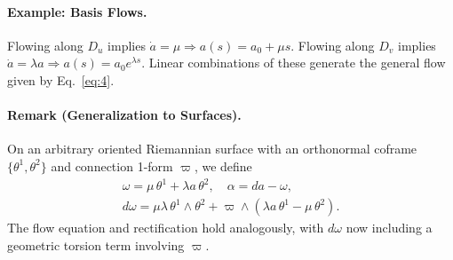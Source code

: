 \paragraph{Example: Basis Flows.}
Flowing along $D_u$ implies $\dot{a} = \mu \Rightarrow a(s) = a_0 + \mu s$. Flowing along $D_v$ implies $\dot{a} = \lambda a \Rightarrow a(s) = a_0 e^{\lambda s}$. Linear combinations of these generate the general flow given by Eq.~\eqref{eq:4}.

\paragraph{Remark (Generalization to Surfaces).}
On an arbitrary oriented Riemannian surface with an orthonormal coframe $\{\theta^1, \theta^2\}$ and connection 1-form $\varpi$, we define
\begin{gather}
\omega=\mu\,\theta^1+\lambda a\,\theta^2, \quad \alpha=da-\omega, \label{eq:18} \tag{18-19} \\
d\omega=\mu\lambda\,\theta^1\wedge\theta^2+\varpi\wedge(\lambda a\,\theta^1-\mu\,\theta^2). \nonumber
\end{gather}
The flow equation and rectification hold analogously, with $d\omega$ now including a geometric torsion term involving $\varpi$.
